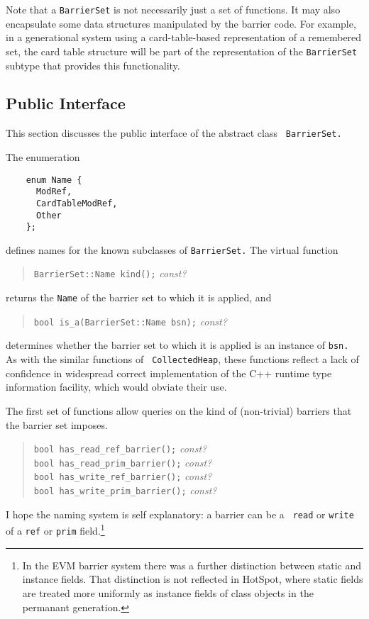 \documentclass{article}
\begin{document}
Note that a {\tt BarrierSet} is not necessarily just a set of
functions.  It may also encapsulate some data structures manipulated
by the barrier code.  For example, in a generational system using a
card-table-based representation of a remembered set, the card table
structure will be part of the representation of the {\tt BarrierSet}
subtype that provides this functionality.

\subsection{Public Interface}

This section discusses the public interface of the abstract class {\tt
BarrierSet.}

The enumeration
\pagebreak
\begin{verbatim}
    enum Name {
      ModRef,
      CardTableModRef,
      Other
    };
\end{verbatim}
defines names for the known subclasses of {\tt BarrierSet.}  The
virtual function
\begin{quote}
    {\tt BarrierSet::Name kind();} {\em const?}
\end{quote}
returns the {\tt Name} of the barrier set to which it is applied, and
\begin{quote}
    {\tt bool is\_a(BarrierSet::Name bsn);} {\em const?}
\end{quote}
determines whether the barrier set to which it is applied is an
instance of {\tt bsn.}  As with the similar functions of {\tt
CollectedHeap}, these functions reflect a lack of confidence in
widespread correct implementation of the C++ runtime type information
facility, which would obviate their use.

The first set of functions allow queries on the kind of (non-trivial)
barriers that the barrier set imposes.
\begin{quote}
    {\tt bool has\_read\_ref\_barrier();} {\em const?} \\
    {\tt bool has\_read\_prim\_barrier();} {\em const?} \\
    {\tt bool has\_write\_ref\_barrier();} {\em const?} \\
    {\tt bool has\_write\_prim\_barrier();} {\em const?}
\end{quote}
I hope the naming system is self explanatory: a barrier can be a {\tt
read} or {\tt write} of a {\tt ref} or {\tt prim} field.\footnote{In
the EVM barrier system there was a further distinction between static
and instance fields.  That distinction is not reflected in HotSpot,
where static fields are treated more uniformly as instance fields of
class objects in the permanant generation.}
\end{document}

